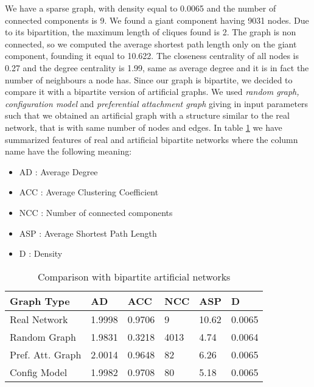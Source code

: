 \documentclass[sigchi]{acmart}
\begin{document}
\newline
We have a sparse graph, with density equal to 0.0065 and the number of connected components is 9. We found a giant component having 9031 nodes. Due to its bipartition, the maximum length of cliques found is 2. The graph is non connected, so we computed the average shortest path length only on the giant component, founding it equal to 10.622. The closeness centrality of all nodes is 0.27 and the degree centrality is 1.99, same as average degree and it is in fact the number of neighbours a node has. \newline
Since our graph is bipartite, we decided to compare it with a bipartite version of artificial graphs. We used \textit{random graph, configuration model} and \textit{preferential attachment graph} giving in input parameters such that we obtained an artificial graph with a structure similar to  the real network, that is with same number of nodes and edges.
In table \ref{table:1} we have summarized features of real and artificial bipartite networks where the column name have the following meaning:
\begin{itemize}
    \item AD : Average Degree
    \item ACC : Average Clustering Coefficient
    \item NCC : Number of connected components
    \item ASP :  Average Shortest Path Length
    \item D : Density
\end{itemize}

\begin{table}[h!]
\begin{tabular}{|l|l|l|l|l|l|}
\hline
{Graph Type} & {AD} & {ACC} & {NCC} & {ASP} & {D}  \\
\hline
Real Network           &1.9998  &0.9706 &9 &10.62 &0.0065 \\
Random Graph      &1.9831  &0.3218 &4013 &4.74  & 0.0064  \\
Pref. Att. Graph   &2.0014 &0.9648 &82 &6.26 &0.0065 \\
Config Model &1.9982 &0.9708 &80  &5.18 &0.0065\\

\hline
\end{tabular} 
\caption{Comparison with bipartite artificial networks}
\label{table:1}
\end{table}
\end{document}
